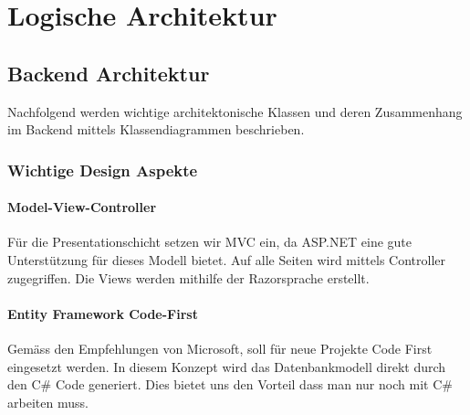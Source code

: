 \chapter{Logische Architektur}


\section{Backend Architektur}
	Nachfolgend werden wichtige architektonische Klassen und deren Zusammenhang im Backend mittels Klassendiagrammen beschrieben.

	

	\subsection{Wichtige Design Aspekte}
		\subsubsection{Model-View-Controller}
		Für die Presentationschicht setzen wir MVC ein, da ASP.NET eine gute Unterstützung für dieses Modell bietet. Auf alle Seiten wird mittels Controller zugegriffen. Die Views werden mithilfe der Razorsprache erstellt.


		\subsubsection{Entity Framework Code-First}
		Gemäss den Empfehlungen von Microsoft, soll für neue Projekte Code First eingesetzt werden. In diesem Konzept wird das Datenbankmodell direkt durch den C\# Code generiert. Dies bietet uns den Vorteil dass man nur noch mit C\# arbeiten muss.

